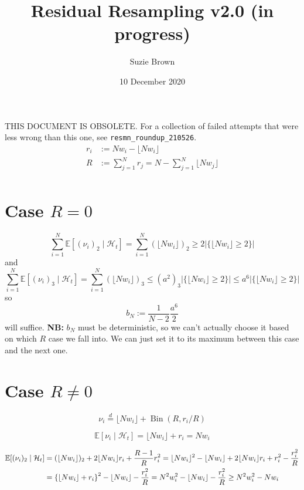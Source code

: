 \documentclass{article}
\title{Residual Resampling v2.0 (in progress)}
\author{Suzie Brown}
\date{10 December 2020}
\newcommand{\E}{\mathbb{E}}
\newcommand{\1}[1]{\mathbbm{1}_{#1}}
\newcommand{\flnw}{\lfloor N w_i \rfloor}
\newcommand{\flnj}{\lfloor N w_j \rfloor}
\newcommand{\Ht}{\mathcal{H}_t}
\begin{document}
\maketitle
\thispagestyle{fancy}

{THIS DOCUMENT IS OBSOLETE. For a collection of failed attempts that were less wrong than this one, see \texttt{resmn\_roundup\_210526}. } \\

\begin{align}
r_i &:= Nw_i - \flnw \\
R &:= \sum_{j=1}^N r_j = N - \sum_{j=1}^N \flnj \\
\end{align}

\section*{Case $R = 0$}

\begin{equation}
\sum_{i=1}^N \E[ (\nu_i)_2 \mid \Ht] = \sum_{i=1}^N (\flnw)_2 \geq 2 | \{ \flnw \geq 2 \} |
\end{equation}
and
\begin{equation}
\sum_{i=1}^N \E[ (\nu_i)_3 \mid \Ht] = \sum_{i=1}^N (\flnw)_3 \leq (a^2)_3 | \{ \flnw \geq 2 \} | \leq a^6 | \{ \flnw \geq 2 \} |
\end{equation}
so
\begin{equation}
b_N := \frac{1}{N-2} \frac{a^6}{2}
\end{equation}
will suffice.
\textbf{NB:} $b_N$ must be deterministic, so we can't actually choose it based on which $R$ case we fall into. We can just set it to its maximum between this case and the next one.

\section*{Case $R \neq 0$}

\begin{equation}
\nu_i \overset{d}{=} \flnw + \operatorname{Bin}(R, r_i/R)
\end{equation}

\begin{equation}
\E[ \nu_i \mid \Ht] = \flnw + r_i = Nw_i
\end{equation}

\begin{align}
\E[ (\nu_i)_2 \mid \Ht] &= (\flnw)_2 + 2\flnw r_i + \frac{R-1}{R} r_i^2
= \flnw^2 - \flnw + 2 \flnw r_i + r_i^2 - \frac{r_i^2}{R} \notag\\
&= \left\{ \flnw + r_i \right\}^2 - \flnw - \frac{r_i^2}{R}
= N^2 w_i^2 - \flnw - \frac{r_i^2}{R}
\geq N^2 w_i^2 - Nw_i
\end{align}
\end{document}
